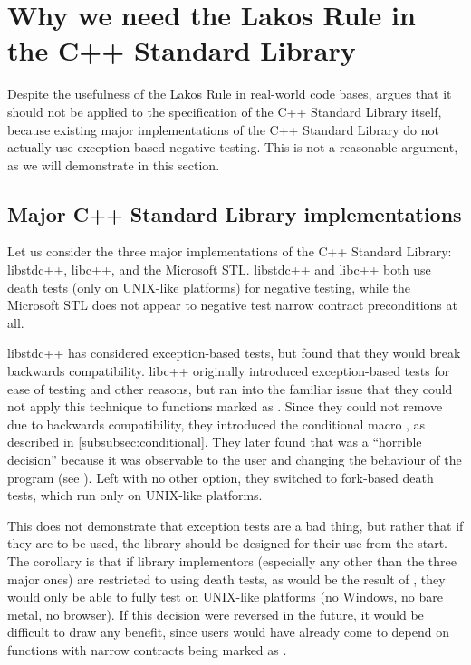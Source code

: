 \section{Why we need the Lakos Rule in the C++ Standard Library}
\label{sec:stdlib}

Despite the usefulness of the Lakos Rule in real-world code bases, \cite{P1656R2} argues that it should not be applied to the specification of the C++ Standard Library itself, because existing major implementations of the C++ Standard Library do not actually use exception-based negative testing. This is not a reasonable argument, as we will demonstrate in this section.

\subsection{Major C++ Standard Library implementations}
\label{subsec:major}

Let us consider the three major implementations of the C++ Standard Library: libstdc++, libc++, and the Microsoft STL. libstdc++ and libc++ both use death tests (only on UNIX-like platforms) for negative testing, while the Microsoft STL does not appear to negative test narrow contract preconditions at all.

libstdc++ has considered exception-based tests, but found that they would break backwards compatibility. libc++ originally introduced exception-based tests for ease of testing and other reasons, but ran into the familiar issue that they could not apply this technique to functions marked as . Since they could not remove  due to backwards compatibility, they introduced the conditional  macro  , as described in \ref{subsubsec:conditional}. They later found that  was a ``horrible decision'' because  it was observable to the user and changing the behaviour of the program (see \cite{LLVMReviewD59166}). Left with no other option, they switched to fork-based death tests, which run only on UNIX-like platforms.

This does not demonstrate that exception tests are a bad thing, but rather that if they are to be used, the library should be designed for their use from the start. The corollary is that if library implementors (especially any other than the three major ones) are restricted to using death tests, as would be the result of \cite{P1656R2}, they would only be able to fully test on UNIX-like platforms (no Windows, no bare metal, no browser). If this decision were reversed in the future, it would be difficult to draw any benefit, since users would have already come to depend on functions with narrow contracts being marked as .

